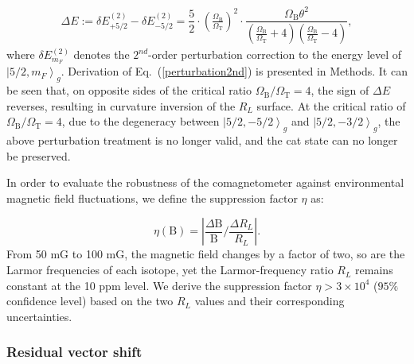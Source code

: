 \documentclass[pdflatex,sn-nature,centre]{sn-jnl}%
\begin{document}
\begin{equation}\label{perturbation2nd}
\begin{aligned}
    \Delta E := \delta E_{+5/2}^{(2)}-\delta E_{-5/2}^{(2)} 
    = \dfrac{5}{2} \cdot \left(\frac{\Omega_{\mathrm B}}{\Omega_{\mathrm T}}\right)^2 \cdot \dfrac{ \Omega_{\mathrm B} \theta^2}  {(\frac{\Omega_{\mathrm B}}{\Omega_{\mathrm T}} + 4)(\frac{\Omega_{\mathrm B}}{\Omega_{\mathrm T}} - 4)} ,
\end{aligned}
\end{equation}
where $\delta E_{m_F}^{(2)}$ denotes the $2^{nd}$-order perturbation correction to the energy level of $\left\vert5/2,m_F\right\rangle_{g}$. Derivation of Eq.~(\ref{perturbation2nd}) is presented in Methods. It can be seen that, on opposite sides of the critical ratio $\Omega_{\mathrm B}/\Omega_{\mathrm T}=4$, the sign of $\Delta E$ reverses, resulting in
curvature inversion of the $R_L$ surface. At the critical ratio of $\Omega_{\mathrm B}/\Omega_{\mathrm T}=4$, due to the degeneracy between $\left\vert5/2,-5/2\right\rangle_g$ and $\left\vert5/2,-3/2\right\rangle_g$, the above perturbation treatment is no longer valid, and the cat state can no longer be preserved.

In order to evaluate the robustness of the comagnetometer against environmental magnetic field fluctuations, we define the suppression factor $\eta$ as:

\begin{equation}
\eta({\mathrm B})=\left\lvert \dfrac{\Delta {\mathrm B}}{\mathrm B} \Big/ \dfrac{\Delta R_L}{R_L} \right\rvert.
\end{equation}
From 50 mG to 100 mG, the magnetic field changes by a factor of two, so are the Larmor frequencies of each isotope, yet the Larmor-frequency ratio $R_L$ remains constant at the 10 ppm level. We derive the suppression factor $\eta>3\times10^4$ ($95\%$ confidence level) based on the two $R_L$ values and their corresponding uncertainties. %


\subsubsection*{Residual vector shift}
\end{document}
